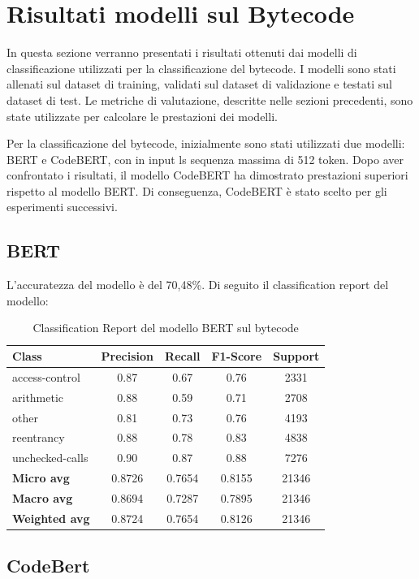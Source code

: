 \documentclass[../../Thesis.tex]{subfiles}
\begin{document}
\section{Risultati modelli sul Bytecode}
In questa sezione verranno presentati i risultati ottenuti dai modelli di classificazione utilizzati per la classificazione del bytecode. I modelli sono stati allenati sul dataset di training, validati sul dataset di validazione e testati sul dataset di test. Le metriche di valutazione, descritte nelle sezioni precedenti, sono state utilizzate per calcolare le prestazioni dei modelli.

Per la classificazione del bytecode, inizialmente sono stati utilizzati due modelli: BERT e CodeBERT, con in input ls sequenza massima di 512 token. Dopo aver confrontato i risultati, il modello CodeBERT ha dimostrato prestazioni superiori rispetto al modello BERT. Di conseguenza, CodeBERT \`e stato scelto per gli esperimenti successivi.
\subsection{BERT}
L'accuratezza del modello \`e del 70,48\%. Di seguito il classification report del modello:
\begin{table}[H]
\centering
\small
\begin{tabular}{lcccc}
\hline
\textbf{Class} & \textbf{Precision} & \textbf{Recall} & \textbf{F1-Score} & \textbf{Support} \\
\hline
access-control & 0.87 & 0.67 & 0.76 & 2331 \\
arithmetic & 0.88 & 0.59 & 0.71 & 2708 \\
other & 0.81 & 0.73 & 0.76 & 4193 \\
reentrancy & 0.88 & 0.78 & 0.83 & 4838 \\
unchecked-calls & 0.90 & 0.87 & 0.88 & 7276 \\
\hline
\textbf{Micro avg} & 0.8726 & 0.7654 & 0.8155 & 21346 \\
\textbf{Macro avg} & 0.8694 & 0.7287 & 0.7895 & 21346 \\
\textbf{Weighted avg} & 0.8724 & 0.7654 & 0.8126 & 21346 \\
\hline
\end{tabular}
\caption{Classification Report del modello BERT sul bytecode}
\end{table}

\subsection{CodeBert}
\end{document}
